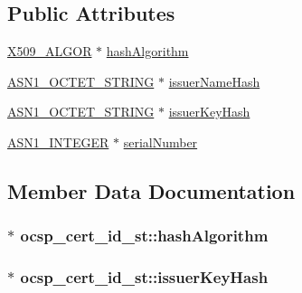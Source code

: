\subsection*{Public Attributes}
\begin{DoxyCompactItemize}
\item 
\hyperlink{ossl__typ_8h_aa2b6185e6254f36f709cd6577fb5022e}{X509\+\_\+\+A\+L\+G\+OR} $\ast$ \hyperlink{structocsp__cert__id__st_ab33f458f416845b6342c235d1afa63be}{hash\+Algorithm}
\item 
\hyperlink{ossl__typ_8h_afbd05e94e0f0430a2b729473efec88c1}{A\+S\+N1\+\_\+\+O\+C\+T\+E\+T\+\_\+\+S\+T\+R\+I\+NG} $\ast$ \hyperlink{structocsp__cert__id__st_a778948e91d91afbfd895f5a3860d8d67}{issuer\+Name\+Hash}
\item 
\hyperlink{ossl__typ_8h_afbd05e94e0f0430a2b729473efec88c1}{A\+S\+N1\+\_\+\+O\+C\+T\+E\+T\+\_\+\+S\+T\+R\+I\+NG} $\ast$ \hyperlink{structocsp__cert__id__st_a46eeca1e6b207fba6e0ca844f59d6838}{issuer\+Key\+Hash}
\item 
\hyperlink{ossl__typ_8h_af4335399bf9774cb410a5e93de65998b}{A\+S\+N1\+\_\+\+I\+N\+T\+E\+G\+ER} $\ast$ \hyperlink{structocsp__cert__id__st_a2385792d7888751bddbaa0dc150e9fbd}{serial\+Number}
\end{DoxyCompactItemize}


\subsection{Member Data Documentation}
\subsubsection[{\texorpdfstring{hash\+Algorithm}{hashAlgorithm}}]{$\ast$ ocsp\+\_\+cert\+\_\+id\+\_\+st\+::hash\+Algorithm}\hypertarget{structocsp__cert__id__st_ab33f458f416845b6342c235d1afa63be}{}\label{structocsp__cert__id__st_ab33f458f416845b6342c235d1afa63be}
\subsubsection[{\texorpdfstring{issuer\+Key\+Hash}{issuerKeyHash}}]{$\ast$ ocsp\+\_\+cert\+\_\+id\+\_\+st\+::issuer\+Key\+Hash}\hypertarget{structocsp__cert__id__st_a46eeca1e6b207fba6e0ca844f59d6838}{}\label{structocsp__cert__id__st_a46eeca1e6b207fba6e0ca844f59d6838}
